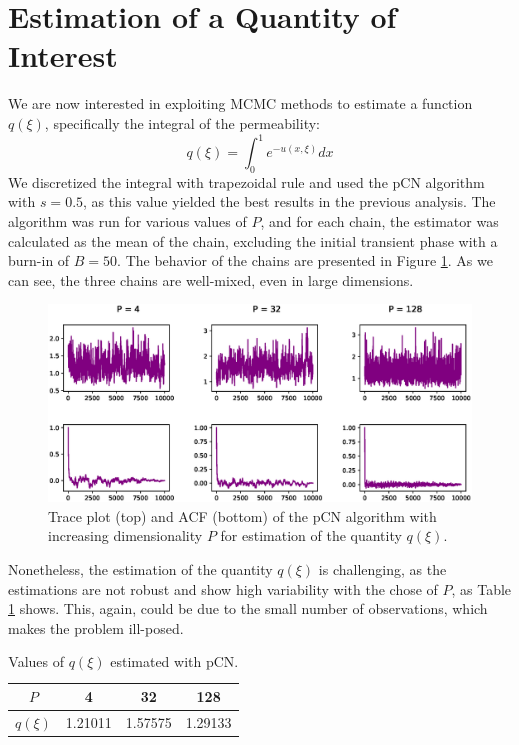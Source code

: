 \documentclass{article}
\begin{document}
\section{Estimation of a Quantity of Interest}
We are now interested in exploiting MCMC methods to estimate a function $q(\xi)$, specifically the integral of the permeability:
\begin{equation*}
    q(\xi) = \int_0^1{e^{-u(x,\xi)} dx}
\end{equation*}
We discretized the integral with trapezoidal rule and used the pCN algorithm with \(s = 0.5\), as this value yielded the best results 
in the previous analysis. The algorithm was run for various values of \(P\), and for
each chain, the estimator was calculated as the mean of the chain, excluding the 
initial transient phase with a burn-in of \(B = 50\). The behavior of the chains are presented in 
Figure \ref{fig:Integral}. As we can see, the three chains are well-mixed, even in large
dimensions. 
\begin{figure}[H]
    \centering
    \includegraphics[width=\textwidth]{plots/Integral.eps}
    \caption{Trace plot (top) and ACF (bottom) of the pCN algorithm with increasing dimensionality \(P\) 
    for estimation of the quantity $q(\xi)$.}
    \label{fig:Integral}
\end{figure}
Nonetheless, the estimation of the quantity \(q(\xi)\) is challenging, as the
estimations are not robust and show high variability with the chose of $P$, as Table \ref{tab:q_estimation} shows. This, again,
could be due to the small number of observations, which makes the problem ill-posed. 
\begin{table}[h!]
    \centering
    \begin{tabular}{|c|c|c|c|}
    \hline
    $P$ & 4 & 32 & 128 \\ \hline
    $q(\xi)$ & 1.21011 & 1.57575  & 1.29133   \\ \hline
    \end{tabular}
    \caption{Values of $q(\xi)$ estimated with pCN.}
    \label{tab:q_estimation}
\end{table}
    
\end{document}
